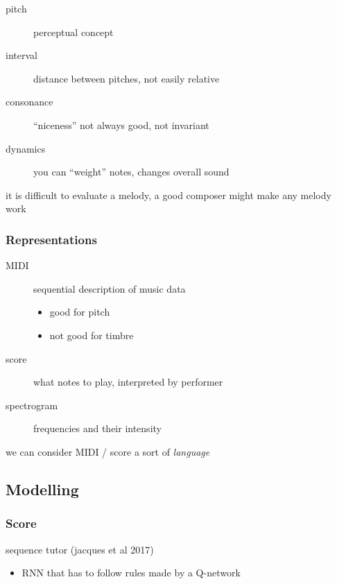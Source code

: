 \documentclass[]{article}
\theoremstyle{definition}
\begin{document}
    \begin{description}
        \item[pitch] perceptual concept
        \item[interval] distance between pitches, not easily relative
        \item[consonance] ``niceness'' not always good, not invariant
        \item[dynamics] you can ``weight'' notes, changes overall sound
    \end{description}

    it is difficult to evaluate a melody, a good composer might make any melody work

    \subsubsection{Representations}%
    \label{ssub:representations}

    \begin{description}
        \item[MIDI] sequential description of music data
            \begin{itemize}
                \item good for pitch
                \item not good for timbre
            \end{itemize}
        \item[score] what notes to play, interpreted by performer
        \item[spectrogram] frequencies and their intensity
    \end{description}

    we can consider MIDI / score a sort of \textit{language}

    \subsection{Modelling}%
    \label{sub:modelling}

    \subsubsection{Score}%
    \label{ssub:score}

    sequence tutor (jacques et al 2017)
    \begin{itemize}
        \item RNN that has to follow rules made by a Q-network
    \end{itemize}
\end{document}
